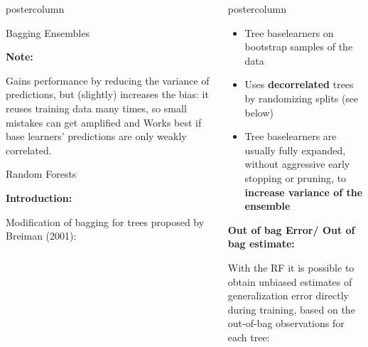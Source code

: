 \documentclass{beamer}
\begin{document}
\begin{frame}[fragile]{}
\begin{columns}
\begin{column}{.31\textwidth}
\begin{beamercolorbox}[center]{postercolumn}
\begin{minipage}{.98\textwidth}
{\begin{myblock}{Bagging Ensembles}
						\begin{codebox}
			\textbf{Note: }
						\end{codebox}
						Gains performance by reducing the variance of predictions, but (slightly) increases the bias: it reuses training data many times, so small mistakes can get amplified and Works best if base learners' predictions are only weakly correlated.
						
             \end{myblock}
             
        \begin{myblock}{Random Forests}
        \begin{codebox} \textbf{Introduction: }
        \end{codebox}
        Modification of bagging for trees proposed by Breiman (2001):
\end{myblock}\vfill
				}
			\end{minipage}
		\end{beamercolorbox}
	\end{column}
	

\begin{column}{.31\textwidth}
\begin{beamercolorbox}[center]{postercolumn}
\begin{minipage}{.98\textwidth}
\parbox[t][\columnheight]{\textwidth}{

  \begin{myblock}{ }
  \begin{itemize}[$\bullet$]     
  \setlength{\itemindent}{+.3in}
  \item Tree baselearners on bootstrap samples of the data
  \item Uses \textbf{decorrelated} trees by randomizing splits (see below)
  \item Tree baselearners are usually fully expanded, without aggressive early stopping or pruning, to \textbf{increase variance of the ensemble}
  \end{itemize}
  
  \begin{codebox}
  \textbf{Out of bag Error/ Out of bag estimate:}
  \end{codebox}
  With the RF it is possible to obtain unbiased estimates of generalization error directly during training, based on the out-of-bag observations for each tree:
  

\end{myblock}}
\end{minipage}
\end{beamercolorbox}
\end{column}
\end{columns}
\end{frame}
\end{document}

